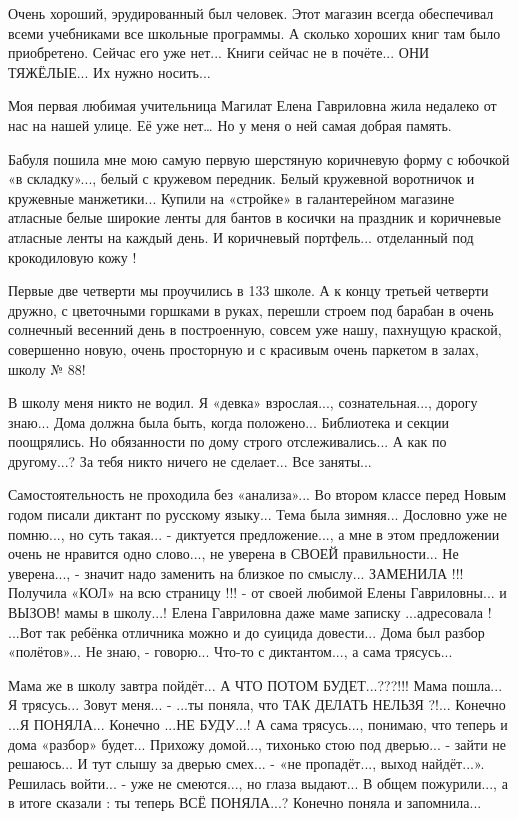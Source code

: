 Очень хороший, эрудированный был человек. Этот магазин всегда обеспечивал всеми
учебниками все школьные программы. А сколько хороших книг там было приобретено.
Сейчас его уже нет... Книги сейчас не в почёте... ОНИ ТЯЖЁЛЫЕ... Их нужно
носить... 

Моя первая любимая учительница Магилат Елена Гавриловна жила недалеко от нас на
нашей улице. Её уже нет… Но у меня о ней самая добрая память. 

Бабуля пошила мне мою самую первую шерстяную коричневую форму с юбочкой «в
складку»..., белый с кружевом передник. Белый кружевной воротничок и кружевные
манжетики... Купили на «стройке» в галантерейном магазине атласные белые
широкие ленты для бантов в косички на праздник и коричневые атласные ленты на
каждый день. И коричневый портфель... отделанный под крокодиловую кожу ! 

Первые две четверти мы проучились в 133 школе. А к концу третьей четверти
дружно, с цветочными горшками в руках, перешли строем под барабан в очень
солнечный весенний день в построенную, совсем уже нашу, пахнущую краской,
совершенно новую, очень просторную и с красивым очень паркетом в залах, школу
№ 88! 

В школу меня никто не водил. Я «девка» взрослая..., сознательная..., дорогу знаю...
Дома должна была быть, когда положено... Библиотека и секции поощрялись. Но
обязанности по дому строго отслеживались... А как по другому...? За тебя никто
ничего не сделает... Все заняты...

Самостоятельность не проходила без «анализа»... Во втором классе перед Новым
годом писали диктант по русскому языку... Тема была зимняя... Дословно уже не
помню..., но суть такая... - диктуется предложение..., а мне в этом предложении
очень не нравится одно слово..., не уверена в СВОЕЙ правильности... Не уверена...,
- значит надо заменить на близкое по смыслу... ЗАМЕНИЛА !!! Получила «КОЛ» на
всю страницу !!! - от своей любимой Елены Гавриловны... и ВЫЗОВ! мамы в школу...!
Елена Гавриловна даже маме записку ...адресовала ! ...Вот так ребёнка отличника
можно и до суицида довести... Дома был разбор «полётов»... Не знаю, - говорю...
Что-то с диктантом..., а сама трясусь...

Мама же в школу завтра пойдёт... А ЧТО ПОТОМ БУДЕТ...???!!! Мама пошла... Я трясусь...
Зовут меня... - ...ты поняла, что ТАК ДЕЛАТЬ НЕЛЬЗЯ ?!... Конечно ...Я ПОНЯЛА...
Конечно ...НЕ БУДУ...! А сама трясусь..., понимаю, что теперь и дома «разбор» будет...
Прихожу домой..., тихонько стою под дверью... - зайти не решаюсь... И тут слышу за
дверью смех... - «не пропадёт..., выход найдёт...». Решилась войти... - уже не
смеются..., но глаза выдают... В общем пожурили..., а в итоге сказали : ты теперь ВСЁ
ПОНЯЛА...? Конечно поняла и запомнила...

